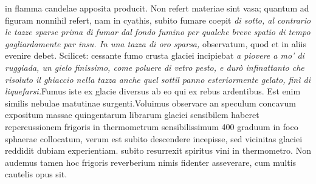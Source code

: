 in  flamma candelae apposita producit. Non refert  materiae  sint vasa; quantum ad figuram nonnihil refert, nam in cyathis, subito  fumare coepit \textit{di sotto, al contrario le tazze sparse prima di fumar  dal fondo fumino per qualche breve spatio di tempo gagliardamente  par insu. In una tazza di oro sparsa,} observatum, quod et in aliis  evenire debet. Scilicet:  cessante fumo crusta glaciei incipiebat \textit{a piovere a mo' di ruggiada, un gielo finissimo,  come poluere di vetro pesto, e dur\`{o} infinattanto che risoluto il ghiaccio nella tazza  anche quel sottil  panno esteriormente  gelato, finì di liquefarsi.}\pend \pstart  Fumus iste ex  glacie diversus ab  eo qui ex rebus  ardentibus. Est  enim similis  nebulae matutinae surgenti.\pend \pstart  Voluimus observare an speculum concavum\protect{} expositum massae quingentarum librarum glaciei  sensibilem haberet repercussionem frigoris in thermometrum\protect{} sensibilissimum 400 graduum  in foco\protect{} sphaerae collocatum, verum est subito descendere incepisse, sed vicinitas glaciei  reddidit dubiam experientiam.  subito resurrexit spiritus vini\protect{} in thermometro\protect{}. Non audemus tamen hoc frigoris reverberium nimis  fidenter asseverare, cum multis cautelis opus sit.\pend 
